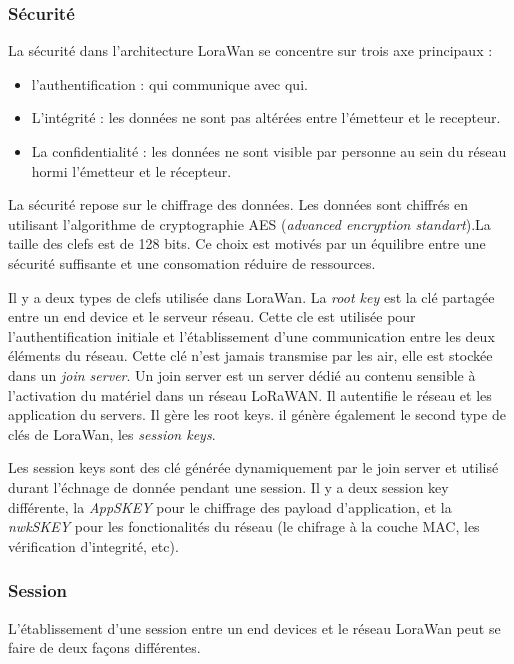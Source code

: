\subsubsection{Sécurité}

La sécurité dans l'architecture LoraWan se concentre sur trois axe principaux :

\begin{itemize}
\item l'authentification : qui communique avec qui.
\item L'intégrité : les données ne sont pas altérées entre l'émetteur et le recepteur.
\item La confidentialité : les données ne sont visible par personne au sein du réseau hormi l'émetteur et le récepteur. 
\end{itemize}

La sécurité repose sur le chiffrage des données. Les données sont chiffrés en utilisant l'algorithme de cryptographie AES (\textit{advanced encryption standart}).La taille des clefs est de 128 bits. Ce choix est motivés par un équilibre entre une sécurité suffisante et une consomation réduire de ressources.

Il y a deux types de clefs utilisée dans LoraWan. La \textit{root key} est la clé partagée entre un end device et le serveur réseau. Cette cle est utilisée pour l'authentification initiale et l'établissement d'une communication entre les deux éléments du réseau. Cette clé n'est jamais transmise par les air, elle est stockée dans un \textit{join server}. Un join server est un server dédié au contenu sensible à l'activation du matériel dans un réseau LoRaWAN. Il autentifie le réseau et les application du servers. Il gère les root keys. il génère également le second type de clés de LoraWan, les \textit{session keys}.

Les session keys sont des clé générée dynamiquement par le join server et utilisé durant l'échnage de donnée pendant une session. Il y a deux session key différente, la \textit{AppSKEY} pour le chiffrage des payload d'application, et la \textit{nwkSKEY} pour les fonctionalités du réseau (le chifrage à la couche MAC, les vérification d'integrité, etc).

\subsubsection{Session}

L'établissement d'une session entre un end devices et le réseau LoraWan peut se faire de deux façons différentes.

